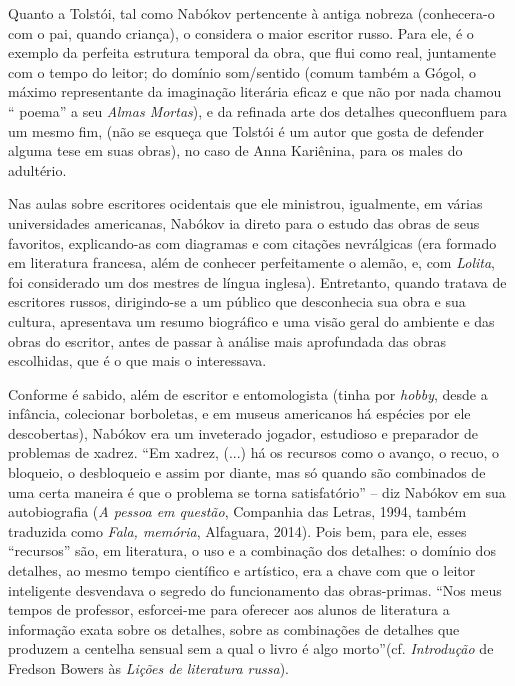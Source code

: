 Quanto a Tolstói, tal como Nabókov pertencente à antiga nobreza
(conhecera-o com o pai, quando criança), o considera o maior escritor
russo. Para ele, é o exemplo da perfeita estrutura temporal da obra, que
flui como real, juntamente com o tempo do leitor; do domínio som/sentido
(comum também a Gógol, o máximo representante da imaginação literária
eficaz e que não por nada chamou `` poema'' a seu \emph{Almas Mortas}),
e da refinada arte dos detalhes queconfluem para um mesmo fim, (não se
esqueça que Tolstói é um autor que gosta de defender alguma tese em suas
obras), no caso de Anna Kariênina, para os males do adultério.

Nas aulas sobre escritores ocidentais que ele ministrou, igualmente, em
várias universidades americanas, Nabókov ia direto para o estudo das
obras de seus favoritos, explicando-as com diagramas e com citações
nevrálgicas (era formado em literatura francesa, além de conhecer
perfeitamente o alemão, e, com \emph{Lolita}, foi considerado um dos
mestres de língua inglesa). Entretanto, quando tratava de escritores
russos, dirigindo-se a um público que desconhecia sua obra e sua
cultura, apresentava um resumo biográfico e uma visão geral do ambiente
e das obras do escritor, antes de passar à análise mais aprofundada das
obras escolhidas, que é o que mais o interessava.

Conforme é sabido, além de escritor e entomologista (tinha por
\emph{hobby}, desde a infância, colecionar borboletas, e em museus
americanos há espécies por ele descobertas), Nabókov era um inveterado
jogador, estudioso e preparador de problemas de xadrez. ``Em xadrez,
(...) há os recursos como o avanço, o recuo, o bloqueio, o desbloqueio e
assim por diante, mas só quando são combinados de uma certa maneira é
que o problema se torna satisfatório'' -- diz Nabókov em sua
autobiografia (\emph{A pessoa em questão}, Companhia das Letras, 1994,
também traduzida como \emph{Fala, memória}, Alfaguara, 2014). Pois bem,
para ele, esses ``recursos'' são, em literatura, o uso e a combinação
dos detalhes: o domínio dos detalhes, ao mesmo tempo científico e
artístico, era a chave com que o leitor inteligente desvendava o segredo
do funcionamento das obras-primas. ``Nos meus tempos de professor,
esforcei-me para oferecer aos alunos de literatura a informação exata
sobre os detalhes, sobre as combinações de detalhes que produzem a
centelha sensual sem a qual o livro é algo morto''(cf. \emph{Introdução}
de Fredson Bowers às \emph{Lições de literatura russa}).

